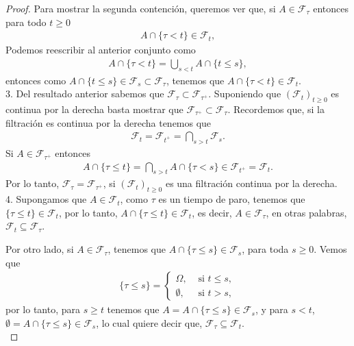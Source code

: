 \begin{proof}
Para mostrar la segunda contención, queremos ver que, si $A \in \mathcal{F}_{\tau}$ entonces para todo $t \geq 0$ 
\begin{align*}
	A \cap \{ \tau < t \} \in \mathcal{F}_t,
\end{align*}
Podemos reescribir al anterior conjunto como
\begin{align*}
A \cap \{ \tau < t \} = \bigcup_{s < t} A \cap \{ t \leq s \},
\end{align*}
entonces como $A \cap \{ t \leq s \} \in \mathcal{F}_s \subset \mathcal{F}_{\tau}$, tenemos que $A \cap \{ \tau < t \} \in \mathcal{F}_t$. \\

3. Del resultado anterior sabemos que $\mathcal{F}_{\tau} \subset \mathcal{F}_{\tau^{+}}$. Suponiendo que $(\mathcal{F}_t)_{t \geq 0}$ es continua por la derecha basta mostrar que $\mathcal{F}_{\tau^{+}} \subset \mathcal{F}_{\tau}$. Recordemos que, si la filtración es continua por la derecha tenemos que 
\begin{align*}
\mathcal{F}_t = \mathcal{F}_{t^{+}} = \bigcap_{s > t} \mathcal{F}_s.
\end{align*}
Si $A \in \mathcal{F}_{\tau^{+}}$ entonces 
\begin{align*}
	A \cap \{ \tau \leq t \} = \bigcap_{s > t} A \cap \{ \tau < s \} \in \mathcal{F}_{t^{+}} = \mathcal{F}_t.
\end{align*}
Por lo tanto, $\mathcal{F}_{\tau} = \mathcal{F}_{\tau^{+}}$, si $(\mathcal{F}_t)_{t \geq 0}$ es una filtración continua por la derecha. \\

4. Supongamos que $A \in \mathcal{F}_t$, como $\tau$ es un tiempo de paro, tenemos que $\{ \tau \leq t \} \in \mathcal{F}_t$, por lo tanto, $A \cap \{ \tau \leq t \} \in \mathcal{F}_t$, es decir, $A \in \mathcal{F}_{\tau}$, en otras palabras, $\mathcal{F}_t \subseteq \mathcal{F}_{\tau}$.

Por otro lado, si $A \in \mathcal{F}_{\tau}$, tenemos que $A \cap \{ \tau \leq s \} \in \mathcal{F}_s$, para toda $s \geq 0$. Vemos que
\begin{align*}
	\{ \tau \leq s \} = 
    \begin{cases}
	\Omega, & \text{ si } t \leq s, \\
    \emptyset, & \text{ si } t > s,
	\end{cases}
\end{align*}
por lo tanto, para $s \geq t$ tenemos que $A = A \cap \{ \tau \leq s \} \in \mathcal{F}_s$, y para $s < t$, $\emptyset = A \cap \{ \tau \leq s \} \in \mathcal{F}_s$, lo cual quiere decir que, $\mathcal{F}_{\tau} \subseteq \mathcal{F}_t$. \\


\end{proof}
